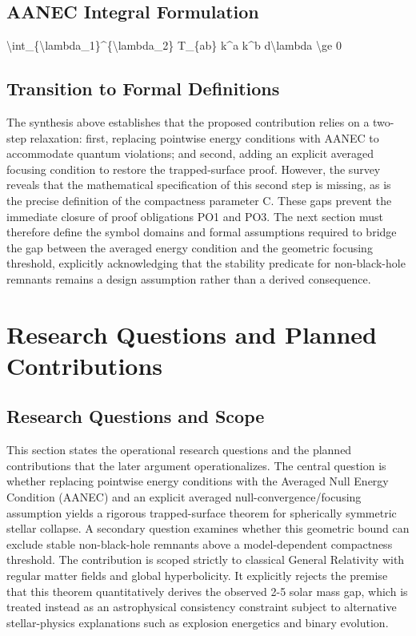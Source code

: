 \documentclass[conference]{IEEEtran}
\begin{document}
\subsection{AANEC Integral Formulation}
\textbackslash{}int\_\{\textbackslash{}lambda\_1\}\textasciicircum{}\{\textbackslash{}lambda\_2\} T\_\{ab\} k\textasciicircum{}a k\textasciicircum{}b d\textbackslash{}lambda \textbackslash{}ge 0~\cite{cite_0ed84243cf171bc4}

\subsection{Transition to Formal Definitions}
The synthesis above establishes that the proposed contribution relies on a two-step relaxation: first, replacing pointwise energy conditions with AANEC to accommodate quantum violations; and second, adding an explicit averaged focusing condition to restore the trapped-surface proof. However, the survey reveals that the mathematical specification of this second step is missing, as is the precise definition of the compactness parameter C. These gaps prevent the immediate closure of proof obligations PO1 and PO3. The next section must therefore define the symbol domains and formal assumptions required to bridge the gap between the averaged energy condition and the geometric focusing threshold, explicitly acknowledging that the stability predicate for non-black-hole remnants remains a design assumption rather than a derived consequence.

\section{Research Questions and Planned Contributions}
\subsection{Research Questions and Scope}
This section states the operational research questions and the planned contributions that the later argument operationalizes. The central question is whether replacing pointwise energy conditions with the Averaged Null Energy Condition (AANEC) and an explicit averaged null-convergence/focusing assumption yields a rigorous trapped-surface theorem for spherically symmetric stellar collapse. A secondary question examines whether this geometric bound can exclude stable non-black-hole remnants above a model-dependent compactness threshold. The contribution is scoped strictly to classical General Relativity with regular matter fields and global hyperbolicity. It explicitly rejects the premise that this theorem quantitatively derives the observed 2-5 solar mass gap, which is treated instead as an astrophysical consistency constraint subject to alternative stellar-physics explanations such as explosion energetics and binary evolution.~\cite{cite_0ed84243cf171bc4}
\end{document}
